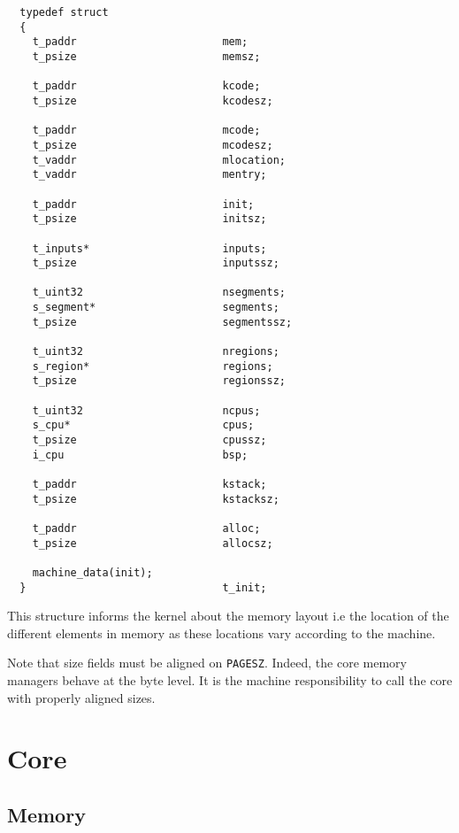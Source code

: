 \begin{verbatim}
  typedef struct
  {
    t_paddr                       mem;
    t_psize                       memsz;

    t_paddr                       kcode;
    t_psize                       kcodesz;

    t_paddr                       mcode;
    t_psize                       mcodesz;
    t_vaddr                       mlocation;
    t_vaddr                       mentry;

    t_paddr                       init;
    t_psize                       initsz;

    t_inputs*                     inputs;
    t_psize                       inputssz;

    t_uint32                      nsegments;
    s_segment*                    segments;
    t_psize                       segmentssz;

    t_uint32                      nregions;
    s_region*                     regions;
    t_psize                       regionssz;

    t_uint32                      ncpus;
    s_cpu*                        cpus;
    t_psize                       cpussz;
    i_cpu                         bsp;

    t_paddr                       kstack;
    t_psize                       kstacksz;

    t_paddr                       alloc;
    t_psize                       allocsz;

    machine_data(init);
  }                               t_init;
\end{verbatim}

This structure informs the kernel about the memory layout i.e the location
of the different elements in memory as these locations vary according to
the machine.

Note that size fields must be aligned on \texttt{PAGESZ}. Indeed, the
core memory managers behave at the byte level. It is the machine responsibility
to call the core with properly aligned sizes.

%
%

\section{Core}


\subsection*{Memory}

